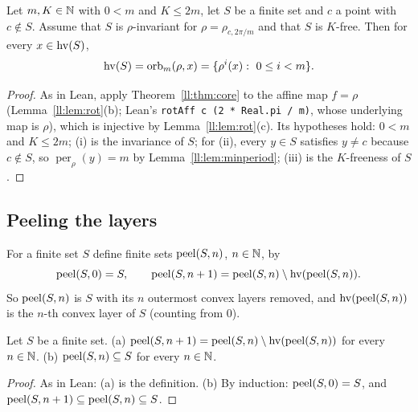 \begin{theorem}\label{ll:thm:core-rot}
Let $m,K\in\mathbb N$ with $0<m$ and $K\le 2m$, let $S$ be a finite set and $c$ a point with $c\notin S$. Assume that $S$ is
$\rho$-invariant for $\rho=\rho_{c,2\pi/m}$ and that $S$ is $K$-free. Then for every $x\in\operatorname{hv}(S)$,
\[\hv(S)=\operatorname{orb}_m(\rho,x)=\{\rho^i(x):\ 0\le i<m\}.\]
\end{theorem}

\begin{proof}
As in Lean, apply Theorem~\ref{ll:thm:core} to the affine map $f=\rho$ (Lemma~\ref{ll:lem:rot}(b); Lean's
\texttt{rotAff c (2 * Real.pi / m)}, whose underlying map is $\rho$), which is injective by Lemma~\ref{ll:lem:rot}(c).
Its hypotheses hold: $0<m$ and $K\le2m$; (i) is the invariance of $S$; for (ii), every $y\in S$ satisfies $y\ne c$
because $c\notin S$, so $\operatorname{per}_\rho(y)=m$ by Lemma~\ref{ll:lem:minperiod}; (iii) is the $K$-freeness of
$S$.
\end{proof}

\subsection{Peeling the layers}

\begin{definition}\label{ll:def:peel}
For a finite set $S$ define finite sets $\operatorname{peel}(S,n)$, $n\in\mathbb N$, by
\[\operatorname{peel}(S,0)=S,\qquad \operatorname{peel}(S,n+1)=\operatorname{peel}(S,n)\setminus\operatorname{hv}(\operatorname{peel}(S,n)).\]
So $\operatorname{peel}(S,n)$ is $S$ with its $n$ outermost convex layers removed, and $\operatorname{hv}(\operatorname{peel}(S,n))$ is the $n$-th convex layer
of $S$ (counting from $0$).
\end{definition}

\begin{lemma}\label{ll:lem:peel-basic}
Let $S$ be a finite set. (a) $\operatorname{peel}(S,n+1)=\operatorname{peel}(S,n)\setminus\operatorname{hv}(\operatorname{peel}(S,n))$ for every $n\in\mathbb N$. (b)
$\operatorname{peel}(S,n)\subseteq S$ for every $n\in\mathbb N$.
\end{lemma}

\begin{proof}
As in Lean: (a) is the definition. (b) By induction: $\operatorname{peel}(S,0)=S$, and
$\operatorname{peel}(S,n+1)\subseteq\operatorname{peel}(S,n)\subseteq S$.
\end{proof}


